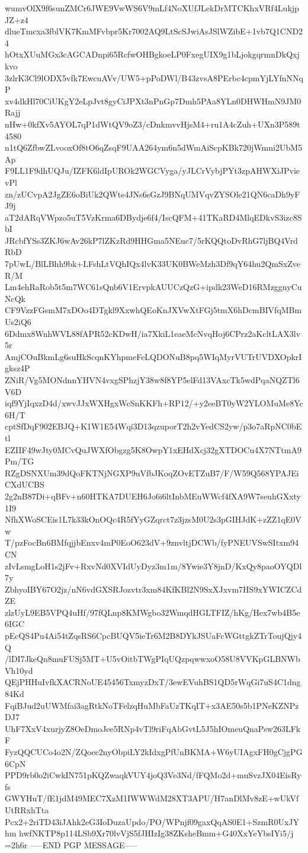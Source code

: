 wumvOlX9f6sunZMCr6JWE9VwWS6V9mLf4NoXUfJLekDrMTCKhxVRf4LukjpJZ+z4
dlueTmcxa3fblVK7KmMFvbpr5Kr7002AQ9LtScSJwiAsJSlWZibE+1vb7Q1CND24
hOtxXUuMGx3cAGCADnpi65RcfwOHBgkoeLP0FxegUIX9g1bLjokgqrmnDkQxjkvo
3zlrK3Cl9lODX5vfk7EwcuAVv/UW5+pPoDWl/B43zvsA8PErbc4cpmYjLYfnNNqP
xv4dkHl70CiUKgY2eLpJvt8gyCiJPXt3nPnGp7Dmh5PAa8YLn0DHWHmN9JM0Rajj
nHw+0kfXv5AYOL7qP1dWtQV9oZ3/cDnkmvvHjsM4+ru1A4cZuh+UXn3P589t4580
n1tQ6ZfbwZLvooxOf8tO6qZsqF9UAA264ym6n5dWmAiScpKBk720jWmni2UbM5Ap
F9LL1F9dhUQJu/IZFK6ldIpUROk2WGCVyga/yJLCrVybjPYt3zpAHWXiJPvievPl
zn/zUCvpA2JgZE6oBiUk2QWte4JNs6sGzJ9BNqUMVqvZYSOle21QN6caDh9yFJ9j
aT2dARqVWpzo5uT5VzKrma6DBydje6f4/IscQFM+41TKaRD4MlqEDkvS3izc8SbI
JRcbfYSs3ZKJ6wAv26kP7lZKzRd9HHGma5NEuc7/5rKQQtoDvRhG7ljBQ4VrdRbD
7pUwL/BlLBhh9bk+LFshLtVQhIQx4lvK33UK0BWeMzh3Df9qY64hu2QmSxZveR/M
Lm4ehRaRob5t5m7WC61sQnb6V1ErvpkAUUCzQzG+ipdk23WeD16RMzggnyCuNcQk
CF9VzzFGsmM7xDOo4DTgkl9XxwhQEoKnJXVwXtFGj5tmX6hDcmBIVfqMBmUs2iQ6
6Ddmx8WnhWVL88fAPR52cKDwH/ia7XkiL1eaeMcNvqHoj6CPrz2aKcltLAX3lv5r
AmjCOuBkmLg6suHkScqnKYhpmeFeLQDONuB8pq5WIqMyrVUTrUVDXOpkrIgksz4P
ZNiR/Vg5MONdnnYHVN4vxgSPhzjY38w8f8YP5elFd13VAxcTk5wdPqaNQZTl6V6D
iqf9YjIqxzD4d/xwvJJxWXHgxWcSnKKFh+RP12/+y2eeBT0yW2YLOMuMe8Yc6H/T
cptSfDqF902EBJQ+K1W1E54Wqi3D13qzuporT2h2vYedCS2yw/p3o7aRpNC0bEtl
EZIIF49wJty0MCvQuJWXfObgzg5K8OwpY1xEHdXcj32gXTDOCu4X7NTtmA9Pm/TG
RZgDSNXUm39dQoFKTNjNGXP9uVfbJKoqZOvETZuB7/F/W59Q568YPAJEiCXdUCBS
2g2nB87Di+qBFv+n60HTKA7DUEH6Jo6i6ltInbMEuWWcf4fXA9W7seuhGXxty1I9
NfhXWoSCEis1L7k33kOnOQc4R5fYyGZqrct7z3jzsM0U2s3pGIHJdK+zZZ1qE0Vw
T/pzFocBn6BMfqjjbEnxv4mP0EoO623dV+9znvltjDCWb/fyPNEUVSwSItxm94CN
zIvLsmgLoH1s2jFv+RxvNd0XVIdUyDyz3m1m/8Ywie3Y8jnD/KxQy8paoOYQDl7y
ZbhyoIBY67O2jz/nN6vdGXSRJozvtr3xm84KfKBl2N9SxXJxvm7HS9xYWICZCdZE
zlzUyL9EB5VPQ4uHf/97fQLnp8KMWgbo32WmqdHGLTFIZ/hKg/Hex7wb4B5e6IGC
pEcQS4Pu4Ai54tZqsRS6CpcBUQV5ieTr6M2B8DYkJSUaFcWGttgkZTrToujQjy4Q
/lDI7JkeQn8muFUSj5MT+U5vOitbTWgPIqUQzpqwwxoO58U8VVKpGLBNWbVh10yd
QEjPHHuIvfkXACRNoUE45456TxmyzDxT/3ewEVuhBS1QD5rWqGi7uS4C1dng84Kd
FqiBJud2uUWMfai3agRtkNoTFelzqHuMbFaUzTKqIT+x3AE50s5b1PNeKZNPzDJ7
UhF7XxV4xurjyZ8OeDmoJee5RNp4vTl9riFqAbGvtL5J5hIOmeuQnaPsw263LFkF
FyzQQCUCo4o2N/ZQoec2nyObpiLY2kIdxgPfUnBKMA+W6yUIAgxFH0gCjgPG6CpN
PPD9rb0o2iCwkIN751pKQZwaqkVUY4joQ3Ve3Nd/fFQMo2d+muSvzJX04EisRyfs
GWYHuT/fE1jdM49MEC7XzM1IWWWdM28XT3APU/H7anDlMv8zE+wUkVfUtRRxhTta
Pcx2+2riTD43iJAhk2eG3IoDuzaUpdo/PO/WPnjf09gaxQqAS0E1+SzmR0UxJYhm
hwfNKTP8p114LSb9Xr70lvVjS5fJHIzIg38ZKsheBmm+G40XxYeYbsIYi5/j
=2h6r
-----END PGP MESSAGE-----
